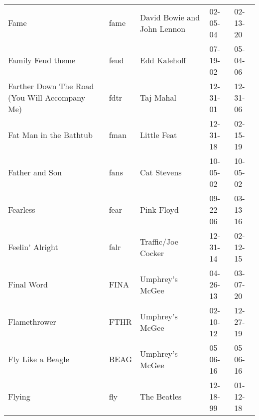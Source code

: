 \begin{longtable}{p{}p{}p{}p{}p{}}
                                                                    Fame &          fame &                              David Bowie and John Lennon &              02-05-04 &             02-13-20 \\
                                                       Family Feud theme &          feud &                                             Edd Kalehoff &              07-19-02 &             05-04-06 \\
                           Farther Down The Road (You Will Accompany Me) &          fdtr &                                                Taj Mahal &              12-31-01 &             12-31-06 \\
                                                  Fat Man in the Bathtub &          fman &                                              Little Feat &              12-31-18 &             02-15-19 \\
                                                          Father and Son &          fans &                                              Cat Stevens &              10-05-02 &             10-05-02 \\
                                                                Fearless &          fear &                                               Pink Floyd &              09-22-06 &             03-13-16 \\
                                                         Feelin' Alright &          falr &                                       Traffic/Joe Cocker &              12-31-14 &             02-12-15 \\
                                                              Final Word &          FINA &                                          Umphrey's McGee &              04-26-13 &             03-07-20 \\
                                                            Flamethrower &          FTHR &                                          Umphrey's McGee &              02-10-12 &             12-27-19 \\
                                                       Fly Like a Beagle &          BEAG &                                          Umphrey's McGee &              05-06-16 &             05-06-16 \\
                                                                  Flying &           fly &                                              The Beatles &              12-18-99 &             01-12-18 \\

\end{longtable}
